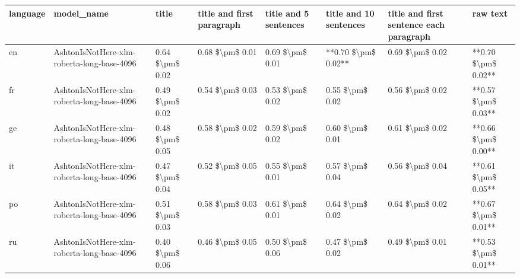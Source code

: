 \begin{tabular}{llllllll}
\toprule
language &                                 model\_name &           title & title and first paragraph & title and 5 sentences & title and 10 sentences & title and first sentence each paragraph &            raw text \\
\midrule
      en & AshtonIsNotHere-xlm-roberta-long-base-4096 & 0.64 \$\textbackslash pm\$ 0.02 &           0.68 \$\textbackslash pm\$ 0.01 &       0.69 \$\textbackslash pm\$ 0.01 &    **0.70 \$\textbackslash pm\$ 0.02** &                         0.69 \$\textbackslash pm\$ 0.02 & **0.70 \$\textbackslash pm\$ 0.02** \\
      fr & AshtonIsNotHere-xlm-roberta-long-base-4096 & 0.49 \$\textbackslash pm\$ 0.02 &           0.54 \$\textbackslash pm\$ 0.03 &       0.53 \$\textbackslash pm\$ 0.02 &        0.55 \$\textbackslash pm\$ 0.02 &                         0.56 \$\textbackslash pm\$ 0.02 & **0.57 \$\textbackslash pm\$ 0.03** \\
      ge & AshtonIsNotHere-xlm-roberta-long-base-4096 & 0.48 \$\textbackslash pm\$ 0.05 &           0.58 \$\textbackslash pm\$ 0.02 &       0.59 \$\textbackslash pm\$ 0.02 &        0.60 \$\textbackslash pm\$ 0.01 &                         0.61 \$\textbackslash pm\$ 0.02 & **0.66 \$\textbackslash pm\$ 0.00** \\
      it & AshtonIsNotHere-xlm-roberta-long-base-4096 & 0.47 \$\textbackslash pm\$ 0.04 &           0.52 \$\textbackslash pm\$ 0.05 &       0.55 \$\textbackslash pm\$ 0.01 &        0.57 \$\textbackslash pm\$ 0.04 &                         0.56 \$\textbackslash pm\$ 0.04 & **0.61 \$\textbackslash pm\$ 0.05** \\
      po & AshtonIsNotHere-xlm-roberta-long-base-4096 & 0.51 \$\textbackslash pm\$ 0.03 &           0.58 \$\textbackslash pm\$ 0.03 &       0.61 \$\textbackslash pm\$ 0.01 &        0.64 \$\textbackslash pm\$ 0.02 &                         0.64 \$\textbackslash pm\$ 0.02 & **0.67 \$\textbackslash pm\$ 0.01** \\
      ru & AshtonIsNotHere-xlm-roberta-long-base-4096 & 0.40 \$\textbackslash pm\$ 0.06 &           0.46 \$\textbackslash pm\$ 0.05 &       0.50 \$\textbackslash pm\$ 0.06 &        0.47 \$\textbackslash pm\$ 0.02 &                         0.49 \$\textbackslash pm\$ 0.01 & **0.53 \$\textbackslash pm\$ 0.01** \\
\bottomrule
\end{tabular}

